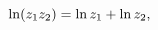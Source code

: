 \[\mathop{\ln\/}\nolimits\!\left(z_{1}z_{2}\right)=\mathop{\ln\/}\nolimits z_{1}%
+\mathop{\ln\/}\nolimits z_{2},\]